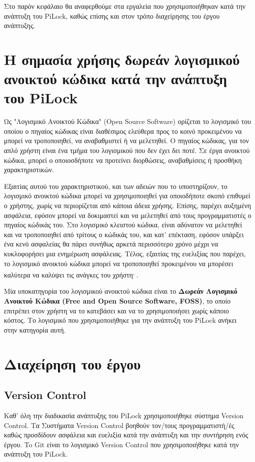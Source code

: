Στο παρόν κεφάλαιο θα αναφερθούμε στα εργαλεία που χρησιμοποιήθηκαν κατά την ανάπτυξη του PiLock, καθώς επίσης και στον τρόπο διαχείρησης του έργου ανάπτυξης.

\section{Η σημασία χρήσης δωρεάν λογισμικού ανοικτού κώδικα κατά την ανάπτυξη του PiLock}
	Ως "Λογισμικό Ανοικτού Κώδικα" (Open Source Software) ορίζεται το λογισμικό του οποίου ο πηγαίος κώδικας είναι διαθέσιμος ελεύθερα προς το κοινό προκειμένου να μπορεί να τροποποιηθεί, να αναβαθμιστεί ή να μελετηθεί. Ο πηγαίος κώδικας, για τον απλό χρήστη είναι ένα τμήμα του λογισμικού που δεν έχει δει ποτέ. Σε έργα ανοικτού κώδικα, μπορεί ο οποιοσδήποτε να προτείνει διορθώσεις, αναβαθμίσεις ή προσθήκη χαρακτηριστικών\textsuperscript{\cite{FOSS_def}}. 

	Εξαιτίας αυτού του χαρακτηριστικού, και των αδειών που το υποστηρίζουν, το λογισμικό ανοικτού κώδικα μπορεί να χρησιμοποιηθεί για οποιοδήποτε σκοπό επιθυμεί ο χρήστης, χωρίς να περιορίζεται από κάποια άδεια χρήσης. Επίσης, παρέχει αυξημένη ασφάλεια, εφόσον μπορεί να δοκιμαστεί και να μελετηθεί από τους προγραμματιστές ο πηγαίος κώδικάς του. Στο λογισμικό κλειστού κώδικα, είναι αδύνατον να μελετηθεί και να τροποποιηθεί από τρίτους ο κώδικάς του, και κατ' επέκταση, εφόσον υπάρξει ένα κενό ασφαλείας θα πάρει συνήθως αρκετά περισσότερο χρόνο μέχρι να κυκλοφορήσει μια ενημέρωση ασφάλειας. Τέλος, εξαιτίας της ευελιξίας που παρέχει, το λογισμικό ανοικτού κώδικα μπορεί να τροποποιηθεί προκειμένου να μπορέσει καλύτερα να καλύψει τις ανάγκες του χρήστη\textsuperscript{\cite{FOSS_def}, \cite{FOSS_benefits}}.

	Μία υποκατηγορία του λογισμικού ανοικτού κώδικα είναι το \textbf{Δωρεάν Λογισμικό Ανοικτού Κώδικα (Free and Open Source Software, FOSS)}, το οποίο επιτρέπει στον χρήστη να το κατεβάσει και να το χρησιμοποιήσει χωρίς κάποιο κόστος. Το λογισμικό που χρησιμοποιήθηκε για την ανάπτυξη του PiLock ανήκει στην κατηγορία αυτή.

\section{Διαχείρηση του έργου}

	\subsection{Version Control}
		Καθ' όλη την διαδικασία ανάπτυξης του PiLock χρησιμοποιήθηκε σύστημα Version Control. Τα Συστήματα Version Control βοηθούν τον/τους προγραμματιστή/ές καθώς προσδίδουν ασφάλεια και ευελιξία κατά την ανάπτυξη και την συντήρηση ενός έργου. To Git είναι το λογισμικό Version Control που χρησιμοποιήθηκε κατά την ανάπτυξη του PiLock.

